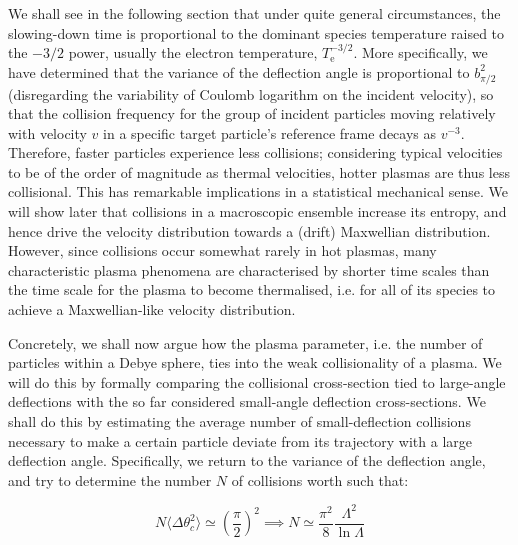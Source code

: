 \quad We shall see in the following section that under quite general circumstances, the slowing-down time is proportional to the dominant species temperature raised to the $-3/2$ power, usually the electron temperature, $T_{\mathrm{e}}^{-3/2}$. More specifically, we have determined that the variance of the deflection angle is proportional to $b_{\pi/2}^2$ (disregarding the variability of Coulomb logarithm on the incident velocity), so that the collision frequency for the group of incident particles moving relatively with velocity $v$ in a specific target particle's reference frame decays as $v^{-3}$. Therefore, faster particles experience less collisions; considering typical velocities to be of the order of magnitude as thermal velocities, hotter plasmas are thus less collisional. This has remarkable implications in a statistical mechanical sense. We will show later that collisions in a macroscopic ensemble increase its entropy, and hence drive the velocity distribution towards a (drift) Maxwellian distribution. However, since collisions occur somewhat rarely in hot plasmas, many characteristic plasma phenomena are characterised by shorter time scales than the time scale for the plasma to become thermalised, i.e. for all of its species to achieve a Maxwellian-like velocity distribution.

\vspace*{2.5pt}

\quad Concretely, we shall now argue how the plasma parameter, i.e. the number of particles within a Debye sphere, ties into the weak collisionality of a plasma. We will do this by formally comparing the collisional cross-section tied to large-angle deflections with the so far considered small-angle deflection cross-sections. We shall do this by estimating the average number of small-deflection collisions necessary to make a certain particle deviate from its trajectory with a large deflection angle. Specifically, we return to the variance of the deflection angle, and try to determine the number $N$ of collisions worth such that:

\begin{equation*}
    N\langle\Delta\theta_c^2\rangle\simeq \left(\frac{\pi}{2}\right)^2\implies N\simeq \frac{\pi^2}{8}\frac{\Lambda^2}{\ln{\Lambda}}
\end{equation*}

